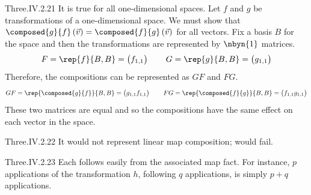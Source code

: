 \begin{ans}{Three.IV.2.21}
      It is true for all one-dimensional spaces.
      Let $f$ and $g$ be transformations of a one-dimensional space.
      We must show that
      $\composed{g}{f}\,(\vec{v})=\composed{f}{g}\,(\vec{v})$
      for all vectors.
      Fix a basis $B$ for the space and then the transformations are
      represented by $\nbyn{1}$ matrices.
      \begin{equation*}
        F=\rep{f}{B,B}=\begin{pmatrix}
                        f_{1,1}
                     \end{pmatrix}
        \qquad
        G=\rep{g}{B,B}=\begin{pmatrix}
                        g_{1,1}
                     \end{pmatrix}
      \end{equation*}
      Therefore, the compositions can be represented as $GF$ and $FG$.
      \begin{equation*}
        GF=\rep{\composed{g}{f}}{B,B}=\begin{pmatrix}
                        g_{1,1}f_{1,1}
                     \end{pmatrix}
        \qquad
        FG=\rep{\composed{f}{g}}{B,B}=\begin{pmatrix}
                        f_{1,1}g_{1,1}
                     \end{pmatrix}
      \end{equation*}
      These two matrices are equal and so the compositions have the same
      effect on each vector in the space.
     
\end{ans}
\begin{ans}{Three.IV.2.22}
      It would not represent linear map composition;
       would fail.
    
\end{ans}
\begin{ans}{Three.IV.2.23}
      Each follows easily from the associated map fact.
      For instance, $p$ applications of the transformation $h$, following $q$
      applications, is simply $p+q$ applications.
    
\end{ans}
